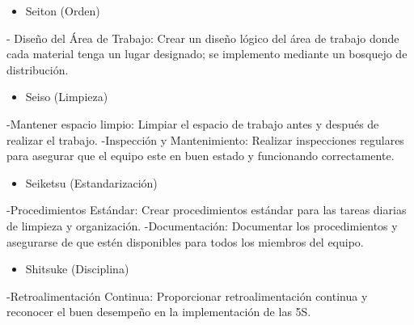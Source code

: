     \begin{itemize}
        \item Seiton (Orden)
    \end{itemize}
    - Diseño del Área de Trabajo: Crear un diseño lógico del área de trabajo donde cada material tenga un lugar designado; se implemento mediante un bosquejo de distribución.
    
    \begin{itemize}
        \item Seiso (Limpieza)
    \end{itemize}
    -Mantener espacio limpio: Limpiar el espacio de trabajo antes y después de realizar el trabajo.
    \newline
    -Inspección y Mantenimiento: Realizar inspecciones regulares para asegurar que el equipo este en buen estado y funcionando correctamente.
    
    \begin{itemize}
        \item Seiketsu (Estandarización)
    \end{itemize}
    
    -Procedimientos Estándar: Crear procedimientos estándar para las tareas diarias de limpieza y organización.
    \newline
    -Documentación: Documentar los procedimientos y asegurarse de que estén disponibles para todos los miembros del equipo.
    
    \begin{itemize}
        \item Shitsuke (Disciplina)
    \end{itemize}
    -Retroalimentación Continua: Proporcionar retroalimentación continua y reconocer el buen desempeño en la implementación de las 5S.
    
    
    
    
    
    
    

